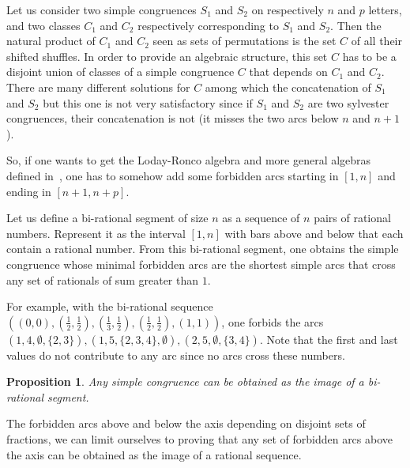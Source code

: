 \documentclass{amsart}
\newtheorem{proposition}[theorem]{Proposition}
\theoremstyle{definition}
\begin{document}
Let us consider two simple congruences $S_1$ and $S_2$ on respectively
$n$ and $p$ letters, and two classes $C_1$ and $C_2$ respectively
corresponding to $S_1$ and $S_2$. Then the natural product of $C_1$ and $C_2$
seen as sets of permutations is the set $C$ of all their shifted shuffles. In
order to provide an algebraic structure, this set $C$ has to be a disjoint
union of classes of a simple congruence $C$ that depends on $C_1$ and $C_2$.
There are many different solutions for $C$ among which the concatenation of
$S_1$ and $S_2$ but this one is not very satisfactory since if $S_1$ and $S_2$
are two sylvester congruences, their concatenation is not (it misses the
two arcs below $n$ and $n+1$).

So, if one wants to get the Loday-Ronco algebra and more general
algebras defined in~\cite{ChatelPilaud, PilaudPons-permutrees}, one has to
somehow add some forbidden arcs starting in $[1,n]$ and ending in $[n+1,n+p]$. 

Let us define a bi-rational segment of size $n$ as a sequence of $n$ pairs of
rational numbers. Represent it as the interval $[1,n]$ with bars above and
below that each contain a rational number.
From this bi-rational segment, one obtains the simple congruence whose minimal
forbidden arcs are the shortest simple arcs that cross any set of rationals of
sum greater than $1$.

For example, with the bi-rational sequence
$( (0,0),(\frac12,\frac12),(\frac13,\frac12),(\frac12,\frac12), (1,1) )$,
one forbids the arcs $(1,4,\emptyset,\{2,3\}), (1,5,\{2,3,4\},\emptyset),
(2,5,\emptyset,\{3,4\})$. Note that the first and last values do not
contribute to any arc since no arcs cross these numbers.

\begin{proposition}
Any simple congruence can be obtained as the image of a bi-rational segment.
\end{proposition}

The forbidden arcs above and below the axis depending on disjoint sets of
fractions, we can limit ourselves to proving that any set of forbidden arcs
above the axis can be obtained as the image of a rational sequence.
\end{document}
